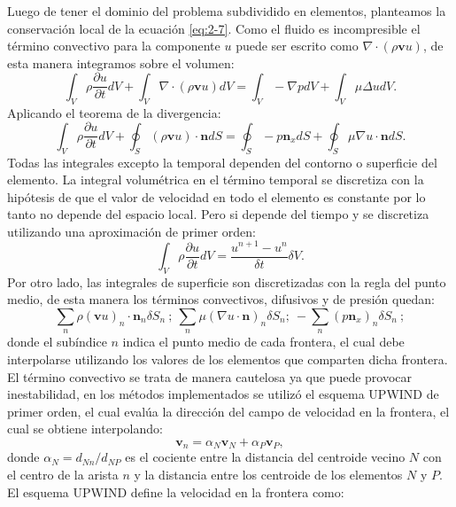 \documentclass[a4paper,10pt, oneside]{book}
\begin{document}
Luego de tener el dominio del problema subdividido en elementos, planteamos la conservación local de la ecuación \ref{eq:2-7}. Como el fluido es incompresible el término convectivo para la componente $u$ puede ser escrito como $\nabla \cdot (\rho \mathbf{v} u )$, de esta manera integramos sobre el volumen:
\begin{equation}
	\int_V  \rho \frac{\partial u}{\partial t} dV + \int_V  \nabla  \cdot \left( \rho \mathbf{v} u \right) dV = \int_V - \nabla p dV + \int_V  \mu \Delta u dV. \nonumber
\end{equation}
Aplicando el teorema de la divergencia:
\begin{equation}
	\int_V  \rho \frac{\partial u}{\partial t} dV + \oint_S  \left( \rho \mathbf{v} u \right) \cdot \mathbf{n} dS = \oint_S - p \mathbf{n}_x dS + \oint_S \mu \nabla u \cdot \mathbf{n} dS. \nonumber
\end{equation}
Todas las integrales excepto la temporal dependen del contorno o superficie del elemento. La integral volumétrica en el término temporal se discretiza con la hipótesis de que el valor de velocidad en todo el elemento es constante por lo tanto no depende del espacio local. Pero si depende del tiempo y se discretiza utilizando una aproximación de primer orden:
\begin{equation}
	\int_V  \rho \frac{\partial u}{\partial t} dV = \frac{u^{n+1} - u^n}{\delta t} \delta V. \nonumber
\end{equation}
Por otro lado, las integrales de superficie son discretizadas con la regla del punto medio, de esta manera los términos convectivos, difusivos y de presión quedan:
\begin{equation}
	\sum_n \rho \left( \mathbf{v} u \right)_n \cdot \mathbf{n}_n \delta S_n ~ ; ~ \sum_n \mu ( \nabla u \cdot \mathbf{n} )_n  \delta S_n; ~ - \sum_n ( p \mathbf{n}_x )_n \delta S_n ~ ;  \nonumber
\end{equation}
donde el subíndice $n$ indica el punto medio de cada frontera, el cual debe interpolarse utilizando los valores de los elementos que comparten dicha frontera. El término convectivo se trata de manera cautelosa ya que puede provocar inestabilidad, en los métodos implementados se utilizó el esquema UPWIND de primer orden, el cual evalúa la dirección del campo de velocidad en la frontera, el cual se obtiene interpolando:
\begin{equation}
	 \mathbf{v}_n = \alpha_N \mathbf{v}_N + \alpha_P \mathbf{v}_P, \nonumber
\end{equation}
donde $\alpha_N = d_{Nn} / d_{NP}$ es el cociente entre la distancia del centroide vecino $N$ con el centro de la arista $n$ y la distancia entre los centroide de los elementos $N$ y $P$. El esquema UPWIND define la velocidad en la frontera como:
\end{document}
